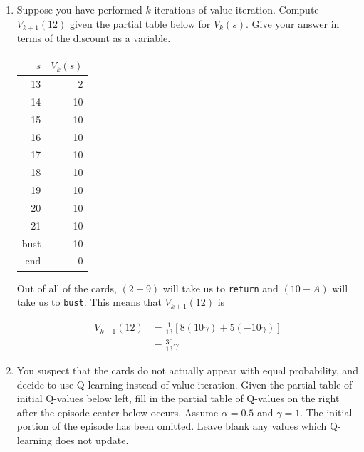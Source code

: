 \documentclass[12pt]{article}
\begin{document}
\begin{enumerate}

\item Suppose you have performed $k$ iterations of value iteration.
  Compute $V_{k+1}(12)$ given the partial table below for $V_k(s)$.
  Give your answer in terms of the discount as a variable.

\begin{center}
\begin{tabular}{|r|r|} \hline
$s$  & $V_k(s)$\\ \hline
13   &   2     \\
14   &  10     \\
15   &  10     \\
16   &  10     \\
17   &  10     \\
18   &  10     \\
19   &  10     \\
20   &  10     \\
21   &  10     \\
bust & -10     \\
end  &  0      \\ \hline
\end{tabular}
\end{center}

Out of all of the cards, $(2-9)$ will take us to {\tt return} and $(10-A)$ will take us to {\tt bust}. This means that $V_{k+1}(12)$ is

\begin{align*}
   V_{k+1}(12) &= \frac{1}{13}\left[8(10\gamma) + 5(-10\gamma) \right]\\
              &= \frac{30}{13}\gamma
\end{align*}

\item You suspect that the cards do not actually appear with equal
  probability, and decide to use Q-learning instead of value
  iteration.  Given the partial table of initial Q-values below left,
  fill in the partial table of Q-values on the right after the episode
  center below occurs.  Assume $\alpha=0.5$ and $\gamma=1$.  The
  initial portion of the episode has been omitted.  Leave blank any
  values which Q-learning does not update.


\end{enumerate}
\end{document}
